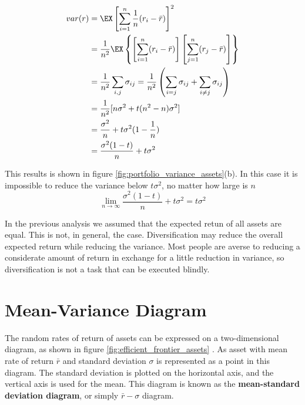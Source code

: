\begin{equation}
\begin{split}
var(r) & = \EX \left[ \sum_{i=1}^n \frac{1}{n}(r_i - \bar{r}) \right]^2 \\
& = \frac{1}{n^2} \EX \left\{ \left[ \sum_{i=1}^n (r_i - \bar{r}) \right] \left[ \sum_{j=1}^n (r_j - \bar{r}) \right] \right\} \\
& = \frac{1}{n^2} \sum_{i,j} \sigma_{i j} = \frac{1}{n^2} \left( \sum_{i=j} \sigma_{i j} + \sum_{i \neq j} \sigma_{i j} \right) \\
& = \frac{1}{n^2}[n \sigma^2 + t(n^2-n) \sigma^2 ] \\
& = \frac{\sigma^2}{n} + t \sigma^2 ( 1 - \frac{1}{n}) \\
& = \frac{\sigma^2(1-t)}{n} + t \sigma^2 
\end{split}
\end{equation}

This results is shown in figure \ref{fig:portfolio_variance_assets}(b). In this case it is impossible to reduce the variance below $t \sigma^2$, no matter how large is $n$
$$ \lim_{n \rightarrow \infty} \frac{\sigma^2(1-t)}{n} + t \sigma^2 = t \sigma ^2 $$


\hfill \break

In the previous analysis we assumed that the expected retun of all assets are equal. This is not, in general, the case. Diversification may reduce the overall expected return while reducing the variance. Most people are averse to reducing a considerate amount of return in exchange for a little reduction in variance, so diversification is not a task that can be executed blindly. 


\section{Mean-Variance Diagram}
\label{s:mean_variance_diagram}

The random rates of return of assets can be expressed on a two-dimensional diagram, as shown in figure \ref{fig:efficient_frontier_assets} . As asset with mean rate of return $\bar{r}$ and standard deviation $\sigma$ is represented as a point in this diagram. The standard deviation is plotted on the horizontal axis, and the vertical axis is used for the mean. This diagram is known as the \textbf{mean-standard deviation diagram}, or simply $\bar{r}-\sigma$ diagram. 

